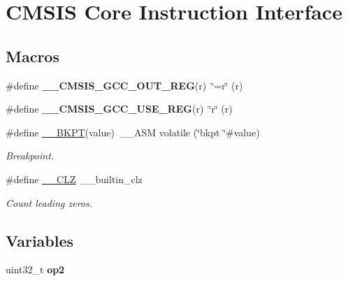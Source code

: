 \hypertarget{group__CMSIS__Core__InstructionInterface}{}\section{C\+M\+S\+IS Core Instruction Interface}
\label{group__CMSIS__Core__InstructionInterface}
\subsection*{Macros}
\begin{DoxyCompactItemize}
\item 
\mbox{\label{group__CMSIS__Core__InstructionInterface_gabc17e391c13c71702366c67cba39c276}} 
\#define {\bfseries \+\_\+\+\_\+\+C\+M\+S\+I\+S\+\_\+\+G\+C\+C\+\_\+\+O\+U\+T\+\_\+\+R\+EG}(r)~\char`\"{}=r\char`\"{} (r)
\item 
\mbox{\label{group__CMSIS__Core__InstructionInterface_ga9d94dee7402367961d2cf0accc00fd97}} 
\#define {\bfseries \+\_\+\+\_\+\+C\+M\+S\+I\+S\+\_\+\+G\+C\+C\+\_\+\+U\+S\+E\+\_\+\+R\+EG}(r)~\char`\"{}r\char`\"{} (r)
\item 
\#define \mbox{\hyperlink{group__CMSIS__Core__InstructionInterface_ga15ea6bd3c507d3e81c3b3a1258e46397}{\+\_\+\+\_\+\+B\+K\+PT}}(value)~\+\_\+\+\_\+\+A\+SM volatile (\char`\"{}bkpt \char`\"{}\#value)
\begin{DoxyCompactList}\small\item\em Breakpoint. \end{DoxyCompactList}\item 
\#define \mbox{\hyperlink{group__CMSIS__Core__InstructionInterface_ga5d5bb1527e042be4a9fa5a33f65cc248}{\+\_\+\+\_\+\+C\+LZ}}~\+\_\+\+\_\+builtin\+\_\+clz
\begin{DoxyCompactList}\small\item\em Count leading zeros. \end{DoxyCompactList}\end{DoxyCompactItemize}
\subsection*{Variables}
\begin{DoxyCompactItemize}
\item 
uint32\+\_\+t {\bfseries op2}
\end{DoxyCompactItemize}


